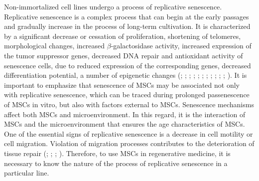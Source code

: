 \documentclass[alpha-refs]{wiley-article}
\begin{document}
Non-immortalized cell lines undergo a process of replicative senescence.
Replicative senescence is a complex process that can begin at the early passages and gradually increase in the process of long-term cultivation.
It is characterized by a significant decrease or cessation of proliferation, shortening of telomeres, morphological changes, increased $\beta$-galactosidase activity, increased expression of the tumor suppressor genes, decreased DNA repair and antioxidant activity of senescence cells, due to reduced expression of the corresponding genes, decreased differentiation potential, a number of epigenetic changes (\cite{wagner2008replicative}; \cite{kuilman2010essence}; \cite{redaelli2012cytogenomic}; \cite{estrada2013human}; \cite{savickiene2016senescence}; \cite{danisovic2017effect}; \cite{koltsova2018dynamics}; \cite{alessio2018mesenchymal}; \cite{krylova2018isolation}; \cite{niedernhofer2018nuclear}; \cite{truong2018characterization}; \cite{yu2018replicative}).
It is important to emphasize that senescence of MSCs may be associated not only with replicative senescence, which can be traced during prolonged passenescence of MSCs in vitro, but also with factors external to MSCs.
Senescence mechanisms affect both MSCs and microenvironment.
In this regard, it is the interaction of MSCs and the microenvironment that ensures the age characteristics of MSCs.
One of the essential signs of replicative senescence is a decrease in cell motility or cell migration.
Violation of migration processes contributes to the deterioration of tissue repair (\cite{geissler2012functional}; \cite{bertolo2015vitro}; \cite{turinetto2016senescence}; \cite{zhang2018overexpression}).
Therefore, to use MSCs in regenerative medicine, it is necessary to know the nature of the process of replicative senescence in a particular line.
\end{document}
